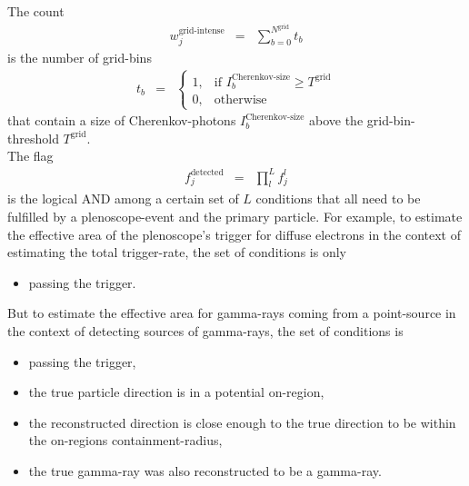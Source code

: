 \documentclass[a4paper,12pt,oneside]{article}
\def\WeightGridSuccesses{w^\text{grid-intense}}
\begin{document}
%
The count
%
\begin{eqnarray}
\WeightGridSuccesses_j &=& \sum_{b=0}^{N^\text{grid}} t_b
\label{EqWeightDetected}
\end{eqnarray}
%
is the number of grid-bins
%
\begin{eqnarray}
t_b &=& \begin{cases}
  1, & \text{if}\,\,I^\text{Cherenkov-size}_b \geq T^\text{grid}\\
  0, & \text{otherwise}
\end{cases}
\label{EqNumBinsAboveThreshold}
\end{eqnarray}
%
that contain a size of Cherenkov-photons $I^\text{Cherenkov-size}_b$ above the grid-bin-threshold $T^\text{grid}$.\\
%
The flag
%
\begin{eqnarray}
f^\text{detected}_j &=& \prod_l^L f^l_j
\label{EqSetOfConditions}
\end{eqnarray}
%
is the logical AND among a certain set of $L$ conditions that all need to be fulfilled by a plenoscope-event and the primary particle.
%
For example, to estimate the effective area of the plenoscope's trigger for diffuse electrons in the context of estimating the total trigger-rate, the set of conditions is only
%
\begin{itemize}
  \item passing the trigger.
\end{itemize}
%
But to estimate the effective area for gamma-rays coming from a point-source in the context of detecting sources of gamma-rays, the set of conditions is
%
\begin{itemize}
  \item passing the trigger,
  \item the true particle direction is in a potential on-region,
  \item the reconstructed direction is close enough to the true direction to be within the on-regions containment-radius,
  \item the true gamma-ray was also reconstructed to be a gamma-ray.
\end{itemize}
%
\end{document}
